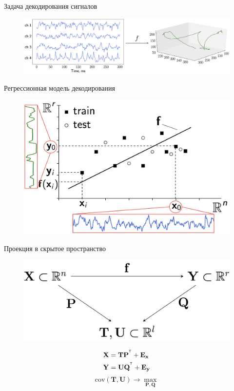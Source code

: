 \documentclass[10pt]{beamer}
\newcommand{\bx}{\mathbf{x}}
\newcommand{\by}{\mathbf{y}}
\newcommand{\bE}{\mathbf{E}}
\newcommand{\bP}{\mathbf{P}}
\newcommand{\bQ}{\mathbf{Q}}
\newcommand{\bT}{\mathbf{T}}
\newcommand{\bU}{\mathbf{U}}
\newcommand{\bX}{\mathbf{X}}
\newcommand{\bY}{\mathbf{Y}}
\newcommand{\T}{^{\text{\tiny\sffamily\upshape\mdseries T}}}
\begin{document}
\begin{frame}{Задача декодирования сигналов}
    \begin{figure}
    	\includegraphics[width=0.85\linewidth]{figs/slide3_1}
    \end{figure}

	\begin{minipage}{.48\linewidth}
		\vspace{-0.2cm}
		\begin{block}{Регрессионная модель декодирования}
		\begin{figure}
			\includegraphics[width=0.85\linewidth]{figs/slide3_3}
		\end{figure}
		\end{block}
		
	\end{minipage}%
	\begin{minipage}{.53\linewidth}
		\begin{block}{Проекция в скрытое пространство}
			\begin{figure}
				\includegraphics[width=0.75\linewidth]{figs/slide3_2}
			\end{figure}
			\vspace{-0.5cm}
			\begin{align*}
				\bX &= \bT \bP^{\T} + \bE_{\bx} \\
				\bY &= \bU \bQ^{\T} + \bE_{\by} \\
			\end{align*}
		\vspace{-1.0cm}
		\[
			\text{cov} (\bT, \bU) \rightarrow \max_{\bP, \bQ}
		\]
		\end{block}
	\vspace{0.3cm}
	\end{minipage}

\end{frame}
\end{document}
